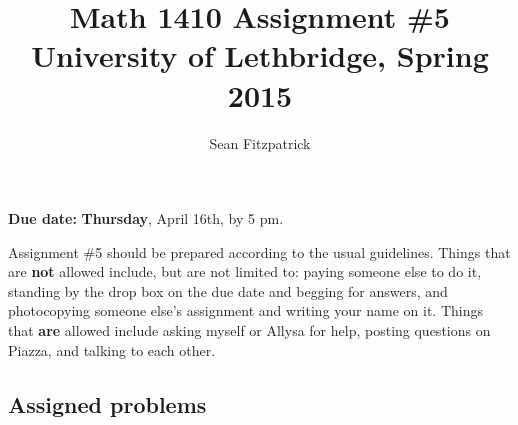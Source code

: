 \documentclass[letterpaper,12pt]{article}
\title{Math 1410 Assignment \#5\\University of Lethbridge, Spring 2015}
\author{Sean Fitzpatrick}
\begin{document}
 \maketitle

{\bf Due date:} {\bf Thursday}, April 16th, by 5 pm.

\bigskip

Assignment \#5 should be prepared according to the usual guidelines. Things that are {\bf not} allowed include, but are not limited to: paying someone else to do it, standing by the drop box on the due date and begging for answers, and photocopying someone else's assignment and writing your name on it. Things that {\bf are} allowed include asking myself or Allysa for help, posting questions on Piazza, and talking to each other.

\subsection*{Assigned problems}
\end{document}
